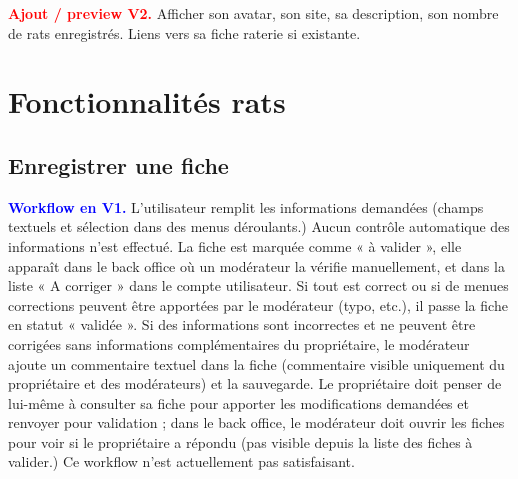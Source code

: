 \documentclass[a4paper,10pt]{article}
\newcommand\existant[1]{\noindent\textbf{\textcolor{blue}{#1}}}
\newcommand\desire[1]{\noindent\textbf{\textcolor{red}{#1}}}
\begin{document}
\desire{Ajout / preview V2.} Afficher son avatar, son site, sa description, son nombre de rats enregistrés. Liens vers sa fiche raterie si existante.

\section{Fonctionnalités rats}

\subsection{Enregistrer une fiche}

\existant{Workflow en V1.} L'utilisateur remplit les informations demandées (champs textuels et sélection dans des menus déroulants.) Aucun contrôle automatique des informations n'est effectué. La fiche est marquée comme « à valider », elle apparaît dans le back office où un modérateur la vérifie manuellement, et dans la liste « A corriger » dans le compte utilisateur. Si tout est correct ou si de menues corrections peuvent être apportées par le modérateur (typo, etc.), il passe la fiche en statut « validée ». Si des informations sont incorrectes et ne peuvent être corrigées sans informations complémentaires du propriétaire, le modérateur ajoute un commentaire textuel dans la fiche (commentaire visible uniquement du propriétaire et des modérateurs) et la sauvegarde. Le propriétaire doit penser de lui-même à consulter sa fiche pour apporter les modifications demandées et renvoyer pour validation ; dans le back office, le modérateur doit ouvrir les fiches pour voir si le propriétaire a répondu (pas visible depuis la liste des fiches à valider.) Ce workflow n'est actuellement pas satisfaisant.
\end{document}
